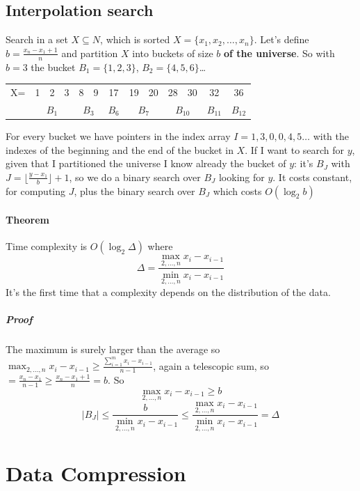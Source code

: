 \documentclass[10pt]{report}
\begin{document}
\subsection{Interpolation search} Search in a set $X \subseteq N$, which is sorted $X=\{x_1,x_2,\ldots,x_n\}$. Let's define $b = \frac{x_n - x_1 + 1}{n}$ and partition $X$ into buckets of size $b$ \textbf{of the universe}. So with $b= 3$ the bucket $B_1 = \{1,2,3\}$, $B_2 = \{4,5,6\}$\ldots
\begin{center}
	\begin{tabular}{c c c c | c c | c | c c | c c | c | c}
	X= & 1 & 2 & 3 & 8 & 9 & 17 & 19 & 20 & 28 & 30 & 32 & 36\\
	 & \multicolumn{3}{c}{$B_1$} & \multicolumn{2}{c}{$B_3$} & \multicolumn{1}{c}{$B_6$} & \multicolumn{2}{c}{$B_7$} & \multicolumn{2}{c}{$B_{10}$} & \multicolumn{1}{c}{$B_{11}$} & \multicolumn{1}{c}{$B_{12}$}
	\end{tabular}
\end{center}
For every bucket we have pointers in the index array $I = 1,3,0,0,4,5\ldots$ with the indexes of the beginning and the end of the bucket in $X$. If I want to search for $y$, given that I partitioned the universe I know already the bucket of $y$: it's $B_J$ with $J = \lfloor\frac{y-x_1}{b}\rfloor + 1$, so we do a binary search over $B_J$ looking for $y$. It costs constant, for computing $J$, plus the binary search over $B_J$ which costs $O(\log_2 b)$
\paragraph{Theorem} Time complexity is $O(\log_2 \Delta)$ where $$\Delta = \frac{\max_{2,\ldots,n} x_i - x_{i-1}}{\min_{2,\ldots,n} x_i - x_{i-1}}$$ It's the first time that a complexity depends on the distribution of the data.
\subparagraph{Proof} The maximum is surely larger than the average so $\max_{2,\ldots,n} x_i - x_{i-1} \geq \frac{\sum_{i=1}^m x_i - x_{i-1}}{n-1}$, again a telescopic sum, so $= \frac{x_n - x_1}{n-1} \geq \frac{x_n - x_1 + 1}{n} = b$. So $$\max_{2,\ldots,n} x_i - x_{i-1} \geq b$$
$$|B_J| \leq \frac{b}{\min_{2,\ldots,n} x_i - x_{i-1}} \leq \frac{\max_{2,\ldots,n} x_i - x_{i-1}}{\min_{2,\ldots,n} x_i - x_{i-1}} = \Delta$$
\section{Data Compression}
\end{document}
